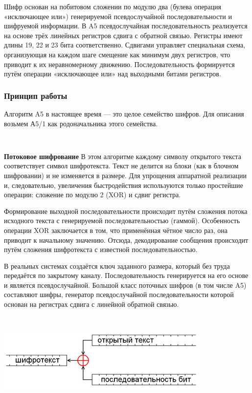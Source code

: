 \documentclass[a4paper]{report}
\begin{document}
Шифр основан на побитовом сложении по модулю два (булева операция «исключающее или») генерируемой псевдослучайной последовательности и шифруемой информации. В A5 псевдослучайная последовательность реализуется на основе трёх линейных регистров сдвига с обратной связью. Регистры имеют длины 19, 22 и 23 бита соответственно. Сдвигами управляет специальная схема, организующая на каждом шаге смещение как минимум двух регистров, что приводит к их неравномерному движению. Последовательность формируется путём операции «исключающее или» над выходными битами регистров.

\subsubsection{Принцип работы}
Алгоритм A5 в настоящее время — это целое семейство шифров. Для описания возьмем А5/1 как родоначальника этого семейства.

~

\textbf{Потоковое шифрование}
В этом алгоритме каждому символу открытого текста соответствует символ шифротекста. Текст не делится на блоки (как в блочном шифровании) и не изменяется в размере. Для упрощения аппаратной реализации и, следовательно, увеличения быстродействия используются только простейшие операции: сложение по модулю 2 (XOR) и сдвиг регистра.

Формирование выходной последовательности происходит путём сложения потока исходного текста с генерируемой последовательностью (гаммой). Особенность операции XOR заключается в том, что применённая чётное число раз, она приводит к начальному значению. Отсюда, декодирование сообщения происходит путём сложения шифротекста с известной последовательностью.

В реальных системах создаётся ключ заданного размера, который без труда передаётся по закрытому каналу. Последовательность генерируется на его основе и является псевдослучайной. Большой класс поточных шифров (в том числе A5) составляют шифры, генератор псевдослучайной последовательности которой основан на регистрах сдвига с линейной обратной связью.

~

\includegraphics[scale=1.1]{Поточный_шифр}
{\\}
\end{document}

